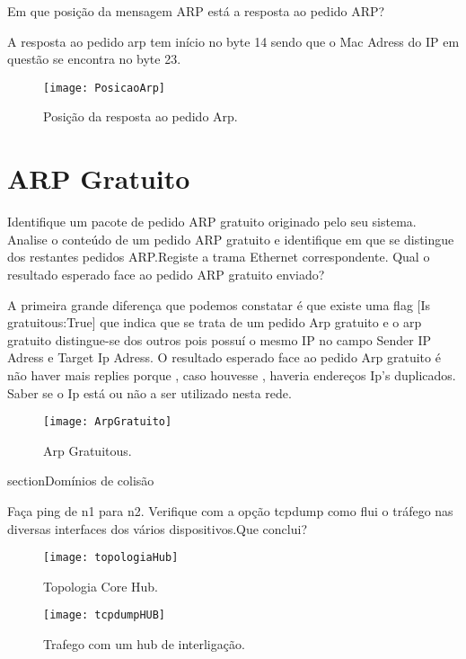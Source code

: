\documentclass{exam}
\begin{document}
\begin{questions}
\question Em que posição da mensagem ARP está a resposta ao pedido ARP?
\begin{solution}
A resposta ao pedido arp tem início no byte 14 sendo que o Mac Adress do IP em questão se encontra no byte 23.
\begin{figure}[H]
\centering\texttt{[image: PosicaoArp]} 
\caption{\label{fig:controller}Posição da resposta ao pedido Arp.}
\end{figure}
\end{solution}



\section{ARP Gratuito}

\question Identifique um pacote de pedido ARP gratuito originado pelo seu sistema.
Analise o conteúdo de um pedido ARP gratuito e identifique em que se distingue dos restantes pedidos ARP.Registe a trama Ethernet correspondente. Qual o resultado esperado face ao pedido ARP gratuito enviado?
\begin{solution}
A primeira grande diferença que podemos constatar é que existe uma flag [Is gratuitous:True] que indica que se trata de um pedido Arp
gratuito e o arp gratuito distingue-se dos outros pois possuí o mesmo IP no campo Sender IP Adress e Target Ip Adress.
O resultado esperado face ao pedido Arp gratuito é não haver mais replies porque , caso houvesse , haveria endereços Ip's duplicados.
Saber se o Ip está ou não a ser utilizado nesta rede.
\end{solution}
\begin{figure}[H]
\centering\texttt{[image: ArpGratuito]} 
\caption{\label{fig:controller}Arp Gratuitous.}
\end{figure}

section{Domínios de colisão}

\question Faça ping de n1 para n2. Verifique com a opção tcpdump como flui o tráfego nas diversas interfaces dos vários dispositivos.Que conclui?

\begin{figure}[H]
\centering\texttt{[image: topologiaHub]} 
\caption{\label{fig:controller}Topologia Core Hub.}
\end{figure}
\begin{figure}[H]
\centering\texttt{[image: tcpdumpHUB]} 
\caption{\label{fig:controller}Trafego com um hub de interligação.}
\end{figure}


\end{questions}
\end{document}
